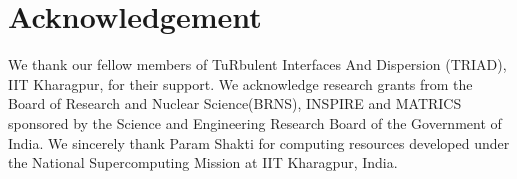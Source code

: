\documentclass[%
 aip,
 amsmath,amssymb,
 reprint,
]{revtex4-1}
\begin{document}
\section{Acknowledgement}
We thank our fellow members of TuRbulent Interfaces And Dispersion (TRIAD), IIT Kharagpur, for their support. We acknowledge research grants from the Board of Research and Nuclear Science(BRNS), INSPIRE and MATRICS sponsored by the Science and Engineering Research Board of the Government of India. We sincerely thank Param Shakti for computing resources developed under the National Supercomputing Mission at IIT Kharagpur, India.














%
\end{document}

